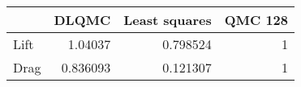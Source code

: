 \begin{tabular}{lrrr}
\toprule
      &    DLQMC &   Least squares &   QMC 128 \\
\midrule
 Lift & 1.04037  &        0.798524 &         1 \\
 Drag & 0.836093 &        0.121307 &         1 \\
\bottomrule
\end{tabular}
